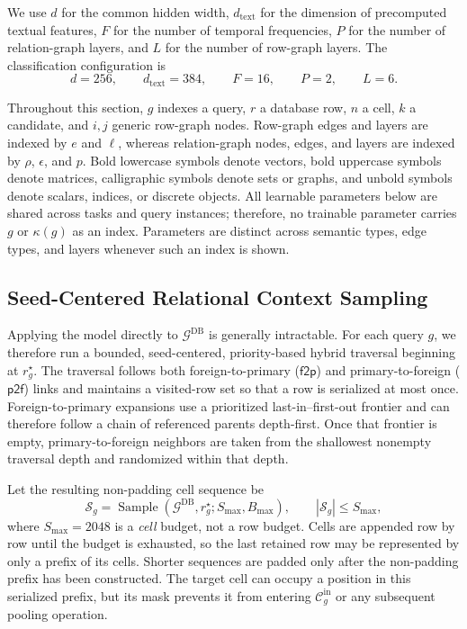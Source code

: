 We use \(d\) for the common hidden width, \(d_{\mathrm{text}}\) for the
dimension of precomputed textual features, \(F\) for the number of temporal
frequencies, \(P\) for the number of relation-graph layers, and \(L\) for
the number of row-graph layers. The classification configuration is
\begin{equation}
  d=256,
  \qquad
  d_{\mathrm{text}}=384,
  \qquad
  F=16,
  \qquad
  P=2,
  \qquad
  L=6.
\label{eq:method:model-dimensions}
\end{equation}

Throughout this section, \(g\) indexes a query, \(r\) a database row,
\(n\) a cell, \(k\) a candidate, and \(i,j\) generic row-graph nodes.
Row-graph edges and layers are indexed by \(e\) and \(\ell\), whereas
relation-graph nodes, edges, and layers are indexed by \(\rho\),
\(\epsilon\), and \(p\). Bold lowercase symbols denote vectors, bold
uppercase symbols denote matrices, calligraphic symbols denote sets or
graphs, and unbold symbols denote scalars, indices, or discrete objects.
All learnable parameters below are shared across tasks and query instances;
therefore, no trainable parameter carries \(g\) or \(\kappa(g)\) as an
index. Parameters are distinct across semantic types, edge types, and
layers whenever such an index is shown.

\subsection{Seed-Centered Relational Context Sampling}
\label{sec:method:context-sampling}

Applying the model directly to \(\mathcal G^{\mathrm{DB}}\) is generally
intractable. For each query \(g\), we therefore run a bounded,
seed-centered, priority-based hybrid traversal beginning at
\(r_g^\star\). The traversal follows both foreign-to-primary
(\(\mathsf{f2p}\)) and primary-to-foreign (\(\mathsf{p2f}\)) links and
maintains a visited-row set so that a row is serialized at most once.
Foreign-to-primary expansions use a prioritized last-in--first-out frontier
and can therefore follow a chain of referenced parents depth-first. Once
that frontier is empty, primary-to-foreign neighbors are taken from the
shallowest nonempty traversal depth and randomized within that depth.

Let the resulting non-padding cell sequence be
\begin{equation}
  \mathcal S_g
  =
  \operatorname{Sample}
  \left(
    \mathcal G^{\mathrm{DB}},
    r_g^\star;
    S_{\max},B_{\max}
  \right),
  \qquad
  |\mathcal S_g|\le S_{\max},
\label{eq:method:context-sample}
\end{equation}
where \(S_{\max}=2048\) is a \emph{cell} budget, not a row budget. Cells
are appended row by row until the budget is exhausted, so the last retained
row may be represented by only a prefix of its cells. Shorter sequences are
padded only after the non-padding prefix has been constructed. The target
cell can occupy a position in this serialized prefix, but its mask prevents
it from entering \(\mathcal C_g^{\mathrm{in}}\) or any subsequent pooling
operation.

